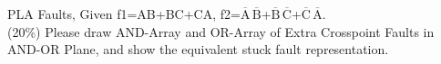 \documentclass[12pt,answers]{exam}
\begin{document}
\begin{questions}
  \question PLA Faults, Given f1=AB+BC+CA, f2=$\overline{\text{A}}\,\overline{\text{B}}$+$\overline{\text{B}}\,\overline{\text{C}}$+$\overline{\text{C}}\,\overline{\text{A}}$. \\
  (20\%) Please draw AND-Array and OR-Array of Extra Crosspoint Faults in AND-OR Plane, and show the equivalent stuck fault representation.
\end{questions}
\end{document}
